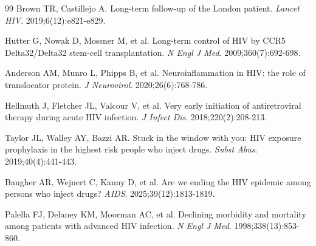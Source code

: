 \documentclass[12pt]{article}
\begin{document}
\begin{thebibliography}{99}
Brown TR, Castillejo A. Long-term follow-up of the London patient. \textit{Lancet HIV}. 2019;6(12):e821-e829.

Hutter G, Nowak D, Mossner M, et al. Long-term control of HIV by CCR5 Delta32/Delta32 stem-cell transplantation. \textit{N Engl J Med}. 2009;360(7):692-698.

Anderson AM, Munro L, Phipps B, et al. Neuroinflammation in HIV: the role of translocator protein. \textit{J Neurovirol}. 2020;26(6):768-786.

Hellmuth J, Fletcher JL, Valcour V, et al. Very early initiation of antiretroviral therapy during acute HIV infection. \textit{J Infect Dis}. 2018;220(2):208-213.

Taylor JL, Walley AY, Bazzi AR. Stuck in the window with you: HIV exposure prophylaxis in the highest risk people who inject drugs. \textit{Subst Abus}. 2019;40(4):441-443.

Baugher AR, Wejnert C, Kanny D, et al. Are we ending the HIV epidemic among persons who inject drugs? \textit{AIDS}. 2025;39(12):1813-1819.

Palella FJ, Delaney KM, Moorman AC, et al. Declining morbidity and mortality among patients with advanced HIV infection. \textit{N Engl J Med}. 1998;338(13):853-860.

\end{thebibliography}
\end{document}
